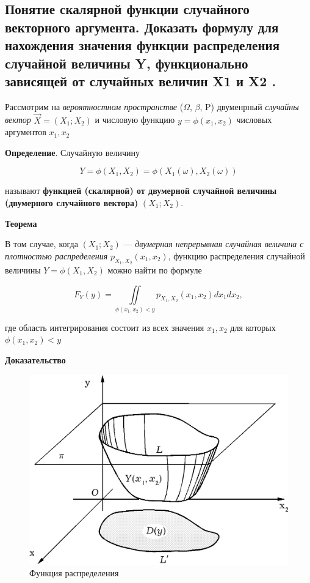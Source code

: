 \subsection{Понятие скалярной функции случайного векторного аргумента. Доказать формулу для нахождения значения функции распределения случайной величины Y, функционально зависящей от случайных величин X1 и X2 .}

Рассмотрим на \textit{вероятностном пространстве} ($\Omega$, $\beta$, P) двуменрный \textit{случайны вектор} $\overrightarrow{X} = (X_1; X_2)$ и числовую функцию $y = \phi(x_1, x_2)$ числовых аргументов $x_1, x_2$

\textbf{Определение}. Случайную величину

\begin{equation}
	\label{stroganov-pidoras}
	Y = \phi(X_1, X_2) = \phi(X_1(\omega), X_2(\omega))
\end{equation}

называют \textbf{функцией (скалярной) от двумерной случайной величины (двумерного случайного вектора)} $(X_1;X_2)$.

\textbf{Теорема}

В том случае, когда $(X_1; X_2)$ --- \textit{двумерная непрерывная случайная величина с плотностью распределения} $p_{X_1, X_2}(x_1, x_2)$, функцию распределения случайной величины $Y = \phi(X_1, X_2)$ можно найти по формуле

\begin{equation}
	\label{jopa2}
	F_Y(y) = \iint\limits_{\phi(x_1, x_2) < y} p_{X_1, X_2}(x_1, x_2)dx_1dx_2, 
\end{equation}


где область интегрирования состоит из всех значения $x_1, x_2$ для которых $\phi(x_1, x_2) < y$

\textbf{Доказательство}

\begin{figure}[ht!]
	\centering
	\includegraphics[width=0.6\linewidth]{assets/jopa-geom.png}
	\caption{Функция распределения}
	\label{fig:alg}
\end{figure}

